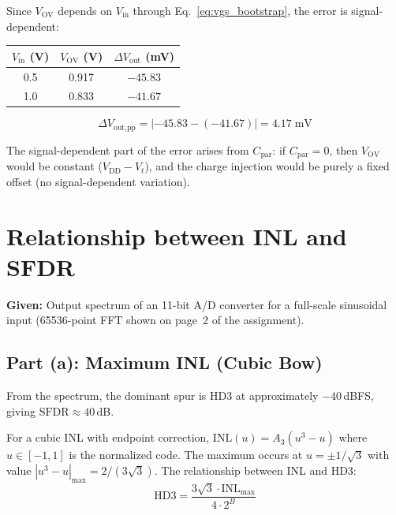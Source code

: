 \documentclass{article}
\begin{document}
Since $V_\text{OV}$ depends on $V_\text{in}$ through Eq.~\eqref{eq:vgs_bootstrap}, the error is signal-dependent:

\begin{table}[H]
\centering
\begin{tabular}{@{}ccc@{}}
\toprule
$V_\text{in}$ (V) & $V_\text{OV}$ (V) & $\Delta V_\text{out}$ (mV) \\
\midrule
0.5 & 0.917 & $-45.83$ \\
1.0 & 0.833 & $-41.67$ \\
\bottomrule
\end{tabular}
\end{table}

\begin{equation}
    \boxed{\Delta V_\text{out,pp} = |{-45.83} - ({-41.67})| = 4.17\;\text{mV}}
\end{equation}

The signal-dependent part of the error arises from $C_\text{par}$: if $C_\text{par} = 0$, then $V_\text{OV}$ would be constant ($V_\text{DD} - V_t$), and the charge injection would be purely a fixed offset (no signal-dependent variation).

\section{Relationship between INL and SFDR}

\textbf{Given:} Output spectrum of an 11-bit A/D converter for a full-scale sinusoidal input (65536-point FFT shown on page~2 of the assignment).

\subsection{Part (a): Maximum INL (Cubic Bow)}

From the spectrum, the dominant spur is HD3 at approximately $-40$\,dBFS, giving $\text{SFDR} \approx 40$\,dB.

For a cubic INL with endpoint correction, $\text{INL}(u) = A_3(u^3 - u)$ where $u \in [-1, 1]$ is the normalized code. The maximum occurs at $u = \pm 1/\sqrt{3}$ with value $|u^3 - u|_\text{max} = 2/(3\sqrt{3})$. The relationship between INL and HD3:
\begin{equation}
    \text{HD3} = \frac{3\sqrt{3} \cdot \text{INL}_\text{max}}{4 \cdot 2^B}
\end{equation}
\end{document}
